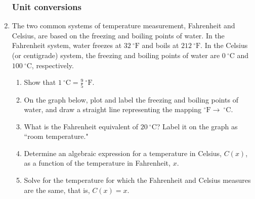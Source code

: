 \documentclass[12pt, oneside]{article}
\begin{document}
\begin{enumerate}
\subsubsection*{Unit conversions}

\item The two common systems of temperature measurement, Fahrenheit and Celsius, are based on the freezing and boiling points of water. In the Fahrenheit system, water freezes at $32 \ ^\circ\text{F}$ and boils at $212 \ ^\circ\text{F}$. In the Celsius (or centigrade) system, the freezing and boiling points of water are $0 \ ^\circ \text{C}$ and $100 \ ^\circ \text{C}$, respectively.
\begin{enumerate}
    \item Show that $\displaystyle 1 \ ^\circ \text{C} = \frac{9}{5} \ ^\circ \text{F}$.
    \item On the graph below, plot and label the freezing and boiling points of water, and draw a straight line representing the mapping $^\circ \text{F}\to \ ^\circ \text{C}$.
    \item What is the Fahrenheit equivalent of $20 \ ^\circ \text{C}$? Label it on the graph as ``room temperature."
    \item Determine an algebraic expression for a temperature in Celsius, $C(x)$, as a function of the temperature in Fahrenheit, $x$.
    \item Solve for the temperature for which the Fahrenheit and Celsius measures are the same, that is, $C(x)=x$.
\end{enumerate}


\end{enumerate}
\end{document}
